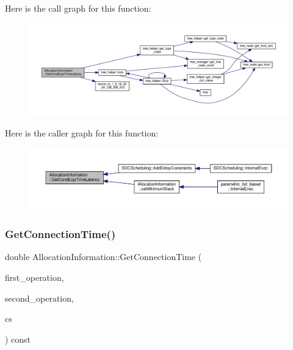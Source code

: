 Here is the call graph for this function\+:
\nopagebreak
\begin{figure}[H]
\begin{center}
\leavevmode
\includegraphics[width=350pt]{d7/d79/classAllocationInformation_a9481db5ab9c2a29958fa5c3da7bfeded_cgraph}
\end{center}
\end{figure}
Here is the caller graph for this function\+:
\nopagebreak
\begin{figure}[H]
\begin{center}
\leavevmode
\includegraphics[width=350pt]{d7/d79/classAllocationInformation_a9481db5ab9c2a29958fa5c3da7bfeded_icgraph}
\end{center}
\end{figure}
\mbox{\label{classAllocationInformation_ae342b26bfe5993d1580c406ceb3cf9d3}} 
\subsubsection{\texorpdfstring{Get\+Connection\+Time()}{GetConnectionTime()}\hspace{0.1cm}{\footnotesize\ttfamily [1/2]}}
{\footnotesize\ttfamily double Allocation\+Information\+::\+Get\+Connection\+Time (\begin{DoxyParamCaption}\item[{const unsigned int}]{first\+\_\+operation,  }\item[{const unsigned int}]{second\+\_\+operation,  }\item[{const \hyperlink{structAbsControlStep}{Abs\+Control\+Step}}]{cs }\end{DoxyParamCaption}) const}



